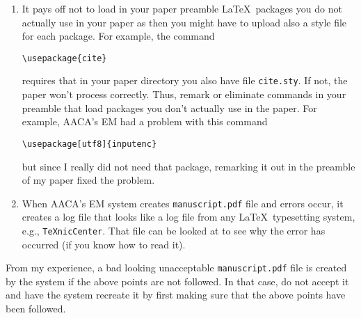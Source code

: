 \documentclass{birkjour}
\theoremstyle{definition}
\theoremstyle{remark}
\newtheorem{comment}[thm]{Comment}
\numberwithin{equation}{section}
\begin{document}
\begin{enumerate}
\begin{comment}
This reordering would need to be done if you make some changes in your 
\texttt{manuscript.tex file}: you would then need to delete the old \texttt{manuscript.tex} in the system by using buttons in the window (see the next comment), upload new \texttt{manuscript.tex}, and then reorder all files making sure that \texttt{manuscript.tex} is listed first. This is because files that have been uploaded, automatically are listed in the order of the upload.
\end{comment}

\begin{comment}
If by mistake, you have uploaded not needed files, to remove them, follow these steps:  
\begin{enumerate}
\item check off each file to be removed: there is a small box on the same level as the file name,

\item once all files to be removed have been checked, click on ``remove selected files''.
\end{enumerate}
\end{comment}

\item It pays off not to load in your paper preamble \LaTeX\ packages you do not actually use in your paper as then you might have to upload also a style file for each package. For example, the command
\begin{verbatim}
\usepackage{cite}
\end{verbatim}
requires that in your paper directory you also have file \texttt{cite.sty}. If not, the paper won't process correctly. Thus, remark or eliminate commands in your preamble that load packages you don't actually use in the paper. For example, AACA's EM had a problem with this command
\begin{verbatim}
\usepackage[utf8]{inputenc}
\end{verbatim}
but since I really did not need that package, remarking it out in the preamble of my paper fixed the problem.

\item  When AACA's EM system creates \texttt{manuscript.pdf} file and errors occur, it creates a log file that looks like a log file from any \LaTeX\ typesetting system, e.g., \texttt{TeXnicCenter}. That file can be looked at to see why the error has occurred (if you know how to read it). 
\end{enumerate}

From my experience, a bad looking unacceptable \texttt{manuscript.pdf} file is created by the system if the above points are not followed. In that case, do not accept it and have the system recreate it by first making sure that the above points have been followed. 
\end{document}
